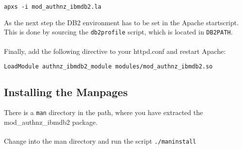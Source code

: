 \documentclass[11pt,letterpaper]{article}
\begin{document}
\begin{verbatim}
apxs -i mod_authnz_ibmdb2.la
\end{verbatim}
As the next step the DB2 environment has to be set in the Apache startscript. This is done by sourcing the {\tt db2profile} script, which is located in {\tt DB2PATH}.\\
\\
Finally, add the following directive to your httpd.conf and restart Apache:

\begin{verbatim}
LoadModule authnz_ibmdb2_module modules/mod_authnz_ibmdb2.so
\end{verbatim}

\subsection{Installing the Manpages}
There is a {\tt man} directory in the path, where you have extracted the mod\_authnz\_ibmdb2 package.\\
\\
Change into the man directory and run the script {\tt ./maninstall}
\newpage
\end{document}
